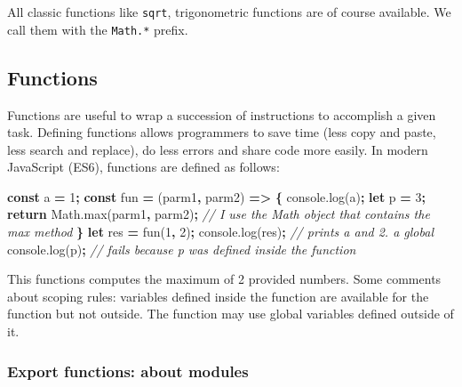 \documentclass[]{book}
\newenvironment{Shaded}{\begin{snugshade}}{\end{snugshade}}
\newcommand{\AttributeTok}[1]{\textcolor[rgb]{0.77,0.63,0.00}{#1}}
\newcommand{\CommentTok}[1]{\textcolor[rgb]{0.56,0.35,0.01}{\textit{#1}}}
\newcommand{\ControlFlowTok}[1]{\textcolor[rgb]{0.13,0.29,0.53}{\textbf{#1}}}
\newcommand{\DecValTok}[1]{\textcolor[rgb]{0.00,0.00,0.81}{#1}}
\newcommand{\KeywordTok}[1]{\textcolor[rgb]{0.13,0.29,0.53}{\textbf{#1}}}
\newcommand{\NormalTok}[1]{#1}
\newcommand{\OperatorTok}[1]{\textcolor[rgb]{0.81,0.36,0.00}{\textbf{#1}}}
\newcommand{\VariableTok}[1]{\textcolor[rgb]{0.00,0.00,0.00}{#1}}
\begin{document}
All classic functions like \texttt{sqrt}, trigonometric functions are of course available. We call them with the \texttt{Math.*} prefix.

\hypertarget{functions}{%
\subsection{Functions}\label{functions}}

Functions are useful to wrap a succession of instructions to accomplish a given task. Defining functions allows programmers to save time (less copy and paste, less search and replace), do less errors and share code more easily. In modern JavaScript (ES6), functions are defined as follows:

\begin{Shaded}
\begin{Highlighting}[]
\KeywordTok{const}\NormalTok{ a }\OperatorTok{=} \DecValTok{1}\OperatorTok{;}
\KeywordTok{const}\NormalTok{ fun }\OperatorTok{=}\NormalTok{ (parm1}\OperatorTok{,}\NormalTok{ parm2) }\OperatorTok{=>} \OperatorTok{\{}
  \VariableTok{console}\NormalTok{.}\AttributeTok{log}\NormalTok{(a)}\OperatorTok{;}
  \KeywordTok{let}\NormalTok{ p }\OperatorTok{=} \DecValTok{3}\OperatorTok{;}
  \ControlFlowTok{return} \VariableTok{Math}\NormalTok{.}\AttributeTok{max}\NormalTok{(parm1}\OperatorTok{,}\NormalTok{ parm2)}\OperatorTok{;} \CommentTok{// I use the Math object that contains the max method}
\OperatorTok{\}}
\KeywordTok{let}\NormalTok{ res }\OperatorTok{=} \AttributeTok{fun}\NormalTok{(}\DecValTok{1}\OperatorTok{,} \DecValTok{2}\NormalTok{)}\OperatorTok{;}
\VariableTok{console}\NormalTok{.}\AttributeTok{log}\NormalTok{(res)}\OperatorTok{;} \CommentTok{// prints a and 2. a global}
\VariableTok{console}\NormalTok{.}\AttributeTok{log}\NormalTok{(p)}\OperatorTok{;} \CommentTok{// fails because p was defined inside the function}
\end{Highlighting}
\end{Shaded}

This functions computes the maximum of 2 provided numbers. Some comments about scoping rules: variables defined inside the function are available for the function but not outside. The function may use global variables defined outside of it.

\hypertarget{export-functions-about-modules}{%
\subsubsection{Export functions: about modules}\label{export-functions-about-modules}}
\end{document}
